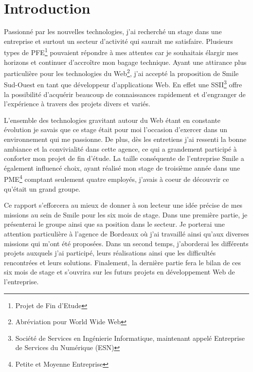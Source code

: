 \documentclass[a4paper,11pt,twoside]{report}
\begin{document}
\sffamily

\chapter*{Introduction}
\thispagestyle{\chead{ }}
Passionné  par les nouvelles technologies, j'ai recherché un stage dans une entreprise et surtout un secteur d'activité qui saurait me satisfaire. Plusieurs types de PFE\footnote{Projet de Fin d'Etude} pouvaient répondre à mes attentes car je souhaitais élargir mes horizons et continuer d'accroître mon bagage technique. Ayant une attirance plus particulière pour les technologies du Web\footnote{Abréviation pour World Wide Web}, j'ai accepté la proposition de Smile Sud-Ouest en tant que développeur d'applications Web. En effet une SSII\footnote{Société de Services en Ingénierie Informatique, maintenant appelé Entreprise de Services du Numérique (ESN)} offre la possibilité d'acquérir beaucoup de connaissances rapidement et d'engranger de l'expérience à travers des projets divers et variés.\newline

L'ensemble des technologies gravitant autour du Web étant en constante évolution je savais que ce stage était pour moi l'occasion d'exercer dans un environnement qui me passionne. De plus, dès les entretiens j'ai ressenti la bonne ambiance et la convivialité dans cette agence, ce qui a grandement participé à conforter mon projet de fin d'étude. La taille conséquente de l'entreprise Smile a également influencé choix, ayant réalisé mon stage de troisième année dans une PME\footnote{Petite et Moyenne Entreprise} comptant seulement quatre employés, j'avais à coeur de découvrir ce qu'était un grand groupe.\newline 

Ce rapport s’efforcera au mieux de donner à son lecteur une idée précise de mes missions au sein de Smile pour les six mois de stage. Dans une première partie, je présenterai le groupe ainsi que sa position dans le secteur. Je porterai une attention particulière à l'agence de Bordeaux où j'ai travaillé ainsi qu'aux diverses missions qui m'ont été proposées. Dans un second temps, j’aborderai les différents projets auxquels j'ai participé, leurs réalisations ainsi que les difficultés rencontrées et leurs solutions. Finalement, la dernière partie fera le bilan de ces six mois de stage et s'ouvrira sur les futurs projets en développement Web de l’entreprise.
\end{document}
